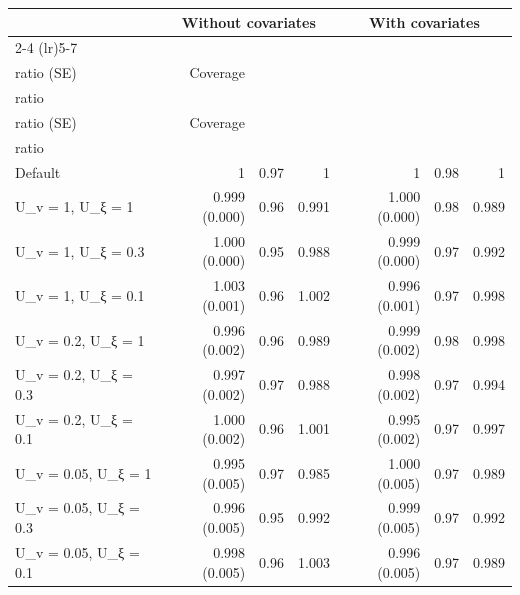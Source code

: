 \begin{table}
\fontsize{9.0pt}{11.0pt}\selectfont\setlength\tabcolsep{3.5pt}
\begin{tabular*}{1\linewidth}{@{\extracolsep{\fill}}lrrrrrr}
\toprule
 & \multicolumn{3}{c}{{Without covariates}} & \multicolumn{3}{c}{{With covariates}} \\ 
\cmidrule(lr){2-4} \cmidrule(lr){5-7}
 & \begin{tabular}[b]{@{}r@{}}RMSE\\ratio (SE)\end{tabular} & Coverage & \begin{tabular}[b]{@{}r@{}}CRPS\\ratio\end{tabular} & \begin{tabular}[b]{@{}r@{}}RMSE\\ratio (SE)\end{tabular} & Coverage & \begin{tabular}[b]{@{}r@{}}CRPS\\ratio\end{tabular} \\ 
\midrule\addlinespace[2.5pt]
Default & 1 & 0.97 & 1 & 1 & 0.98 & 1 \\ 
U\_v = 1, U\_ξ = 1 & 0.999 (0.000) & 0.96 & 0.991 & 1.000 (0.000) & 0.98 & 0.989 \\ 
U\_v = 1, U\_ξ = 0.3 & 1.000 (0.000) & 0.95 & 0.988 & 0.999 (0.000) & 0.97 & 0.992 \\ 
U\_v = 1, U\_ξ = 0.1 & 1.003 (0.001) & 0.96 & 1.002 & 0.996 (0.001) & 0.97 & 0.998 \\ 
U\_v = 0.2, U\_ξ = 1 & 0.996 (0.002) & 0.96 & 0.989 & 0.999 (0.002) & 0.98 & 0.998 \\ 
U\_v = 0.2, U\_ξ = 0.3 & 0.997 (0.002) & 0.97 & 0.988 & 0.998 (0.002) & 0.97 & 0.994 \\ 
U\_v = 0.2, U\_ξ = 0.1 & 1.000 (0.002) & 0.96 & 1.001 & 0.995 (0.002) & 0.97 & 0.997 \\ 
U\_v = 0.05, U\_ξ = 1 & 0.995 (0.005) & 0.97 & 0.985 & 1.000 (0.005) & 0.97 & 0.989 \\ 
U\_v = 0.05, U\_ξ = 0.3 & 0.996 (0.005) & 0.95 & 0.992 & 0.999 (0.005) & 0.97 & 0.992 \\ 
U\_v = 0.05, U\_ξ = 0.1 & 0.998 (0.005) & 0.96 & 1.003 & 0.996 (0.005) & 0.97 & 0.989 \\ 
\bottomrule
\end{tabular*}
\begin{minipage}{\linewidth}
\vspace{.05em}

\end{minipage}
\end{table}
